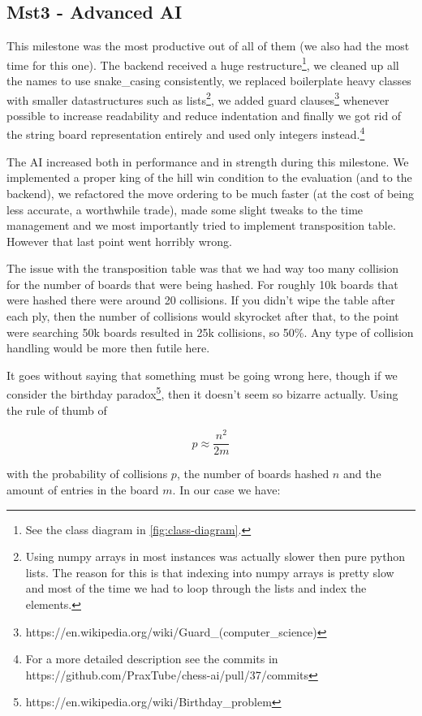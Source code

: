 \subsection{Mst3 - Advanced AI}

This milestone was the most productive out of all of them
(we also had the most time for this one).
The backend received a huge restructure\footnote{
See the class diagram in \autoref{fig:class-diagram}.
}, we cleaned up
all the names to use snake\_casing consistently, we
replaced boilerplate heavy classes with smaller
datastructures such as
lists\footnote{Using numpy arrays in most instances
was actually slower then pure python lists. The reason
for this is that indexing into numpy arrays is pretty
slow and most of the time we had to loop through
the lists and index the elements.}, we added
guard
clauses\footnote{https://en.wikipedia.org/wiki/Guard\_(computer\_science)}
whenever possible to increase readability and reduce
indentation and finally we got rid of the string
board representation entirely and used only integers
instead.\footnote{For a more detailed description see the commits in https://github.com/PraxTube/chess-ai/pull/37/commits}

The AI increased both in performance and in strength during
this milestone. We implemented a proper king of the hill
win condition to the evaluation (and to the backend),
we refactored the move ordering to be much faster
(at the cost of being less accurate, a worthwhile trade),
made some slight tweaks to the time management and we most
importantly tried to implement transposition table. However
that last point went horribly wrong.

The issue with the transposition table was that we had
way too many collision for the number of boards that were being hashed.
For roughly 10k boards that were hashed there were around 20 collisions.
If you didn't wipe the table after each ply,
then the number of collisions would skyrocket after that,
to the point were searching 50k boards resulted in 25k collisions,
so 50\%. Any type of collision handling would be more then futile here.

It goes without saying that something must be going wrong here,
though if we consider the birthday
paradox\footnote{https://en.wikipedia.org/wiki/Birthday\_problem},
then it doesn't seem so bizarre actually.
Using the rule of thumb of 

$$ p \approx \frac{n^2}{2m} $$

with the probability of collisions $p$,
the number of boards hashed $n$ and the amount of entries in the board $m$.
In our case we have:

